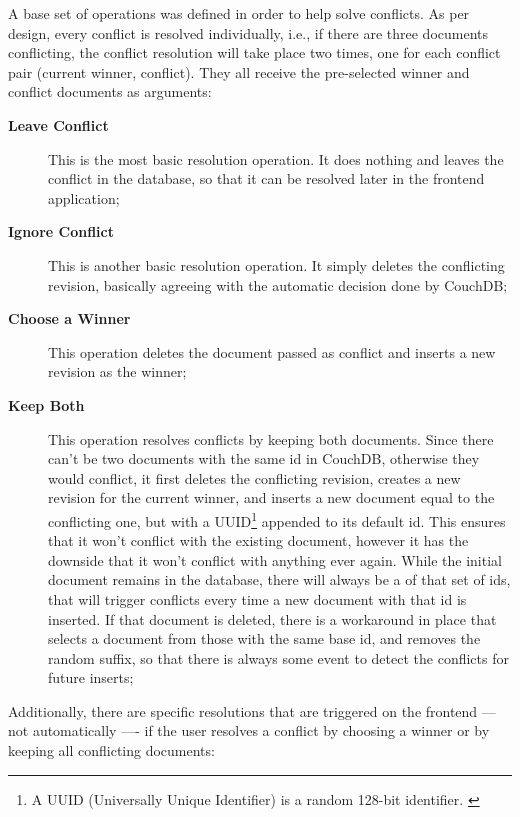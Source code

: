 A base set of operations was defined in order to help solve conflicts. As per design, every conflict is resolved individually, i.e., if there are three documents conflicting, the conflict resolution will take place two times, one for each conflict pair (current winner, conflict). They all receive the pre-selected winner and conflict documents as arguments:
\begin{description}
    \item[\textbf{Leave Conflict}] This is the most basic resolution operation. It does nothing and leaves the conflict in the database, so that it can be resolved later in the frontend application;
    \item[\textbf{Ignore Conflict}] This is another basic resolution operation. It simply deletes the conflicting revision, basically agreeing with the automatic decision done by CouchDB;
    \item[\textbf{Choose a Winner}] This operation deletes the document passed as conflict and inserts a new revision as the winner;
    \item[\textbf{Keep Both}] This operation resolves conflicts by keeping both documents. Since there can't be two documents with the same id in CouchDB, otherwise they would conflict, it first deletes the conflicting revision, creates a new revision for the current winner, and inserts a new document equal to the conflicting one, but with a UUID\footnote{A UUID (Universally Unique Identifier) is a random 128-bit identifier. \cite{uuid-rfc}} appended to its default id. This ensures that it won't conflict with the existing document, however it has the downside that it won't conflict with anything ever again. While the initial document remains in the database, there will always be a  of that set of ids, that will trigger conflicts every time a new document with that id is inserted. If that document is deleted, there is a workaround in place that selects a document from those with the same base id, and removes the random suffix, so that there is always some event to detect the conflicts for future inserts;
\end{description}

Additionally, there are specific resolutions that are triggered on the frontend --- not automatically ---- if the user resolves a conflict by choosing a winner or by keeping all conflicting documents:

